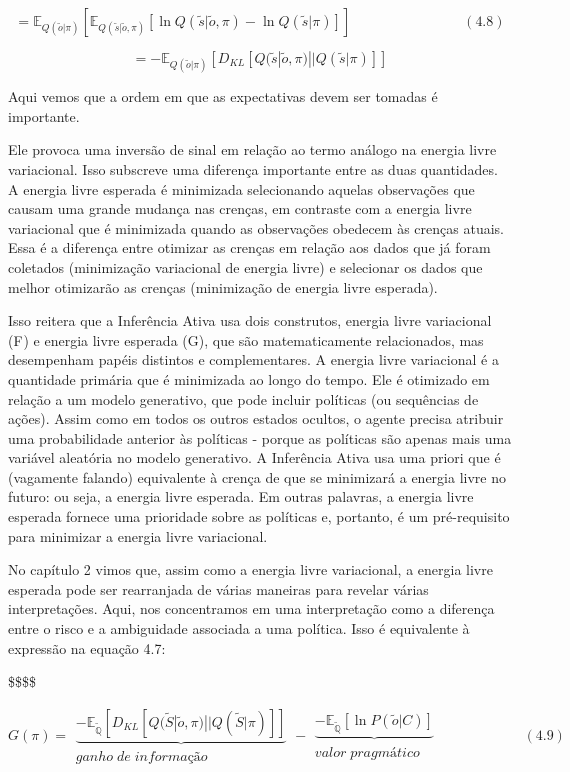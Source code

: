 \documentclass[
  12pt,
]{book}
\begin{document}
\[= \mathbb E_{Q(\tilde o|\pi)}[ \mathbb E_{Q(\tilde s | \tilde o,\pi)}[\ln Q(\tilde s|\tilde o,\pi) - \ln Q(\tilde s| \pi) ] ] \qquad\qquad\qquad\qquad (4.8)\]

\[= - \mathbb E_{Q(\tilde o|\pi)}[D_{KL}[Q(\tilde s | \tilde o, \pi) || Q(\tilde s| \pi)]]\]

Aqui vemos que a ordem em que as expectativas devem ser tomadas é
importante.

Ele provoca uma inversão de sinal em relação ao termo análogo na energia
livre variacional. Isso subscreve uma diferença importante entre as duas
quantidades. A energia livre esperada é minimizada selecionando aquelas
observações que causam uma grande mudança nas crenças, em contraste com
a energia livre variacional que é minimizada quando as observações
obedecem às crenças atuais. Essa é a diferença entre otimizar as crenças
em relação aos dados que já foram coletados (minimização variacional de
energia livre) e selecionar os dados que melhor otimizarão as crenças
(minimização de energia livre esperada).

Isso reitera que a Inferência Ativa usa dois construtos, energia livre
variacional (F ) e energia livre esperada (G), que são matematicamente
relacionados, mas desempenham papéis distintos e complementares. A
energia livre variacional é a quantidade primária que é minimizada ao
longo do tempo. Ele é otimizado em relação a um modelo generativo, que
pode incluir políticas (ou sequências de ações). Assim como em todos os
outros estados ocultos, o agente precisa atribuir uma probabilidade
anterior às políticas - porque as políticas são apenas mais uma variável
aleatória no modelo generativo. A Inferência Ativa usa uma priori que é
(vagamente falando) equivalente à crença de que se minimizará a energia
livre no futuro: ou seja, a energia livre esperada. Em outras palavras,
a energia livre esperada fornece uma prioridade sobre as políticas e,
portanto, é um pré-requisito para minimizar a energia livre variacional.

No capítulo 2 vimos que, assim como a energia livre variacional, a
energia livre esperada pode ser rearranjada de várias maneiras para
revelar várias interpretações. Aqui, nos concentramos em uma
interpretação como a diferença entre o risco e a ambiguidade associada a
uma política. Isso é equivalente à expressão na equação 4.7:

\$\$\$\$

\[G(\pi)=\begin{matrix} \underbrace{-\mathbb{E_\tilde Q}[D_{KL}[Q(\tilde S | \tilde o, \pi)||Q(\tilde S | \pi)]]} \\ ganho\;de\;informação  \end{matrix} - \begin{matrix} \underbrace{-\mathbb{E_\tilde Q}[\ln P(\tilde o | C)]} \\ valor\;pragmático \end{matrix} \qquad \qquad \qquad (4.9)\]
\end{document}
